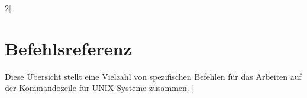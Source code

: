 \documentclass[
a4paper,
fontsize=8pt,
]{scrreprt}
\begin{document}
	\begin{multicols}{2}[
			\chapter{Befehlsreferenz}
		Diese \"Ubersicht stellt eine Vielzahl von spezifischen Befehlen f\"ur das Arbeiten auf der Kommandozeile für UNIX-Systeme zusammen. 
	]
	\tableofcontents
	
	\end{multicols}
\end{document}
